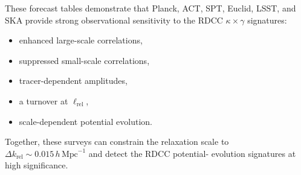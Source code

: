 \documentclass[11pt,a4paper]{article}
\begin{document}
These forecast tables demonstrate that Planck, ACT, SPT, Euclid, LSST, and SKA provide 
strong observational sensitivity to the RDCC $\kappa \times \gamma$ signatures:

\begin{itemize}
    \item enhanced large-scale correlations,
    \item suppressed small-scale correlations,
    \item tracer-dependent amplitudes,
    \item a turnover at $\ell_{\mathrm{rel}}$,
    \item scale-dependent potential evolution.
\end{itemize}

Together, these surveys can constrain the relaxation scale to 
$\Delta k_{\mathrm{rel}} \sim 0.015\,h\,\mathrm{Mpc}^{-1}$ and detect the RDCC potential-
evolution signatures at high significance.


\nocite{*}

\end{document}
